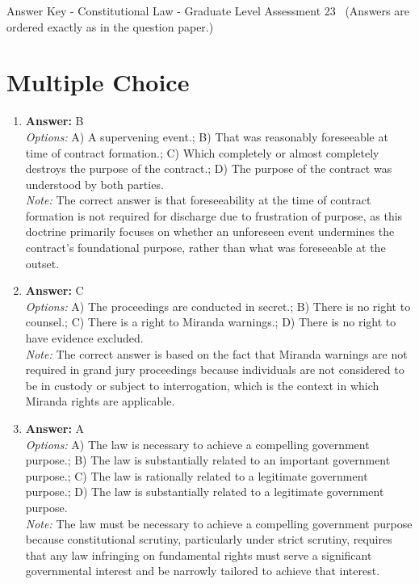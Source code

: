 \documentclass[12pt]{article}
\begin{document}
\begin{center}
Answer Key - Constitutional Law - Graduate Level Assessment 23 \
\small (Answers are ordered exactly as in the question paper.)
\end{center}

\section*{Multiple Choice}
\begin{enumerate}[label=\arabic*.]
\item \textbf{Answer:} B
\\ \textit{Options:} A) A supervening event.; B) That was reasonably foreseeable at time of contract formation.; C) Which completely or almost completely destroys the purpose of the contract.; D) The purpose of the contract was understood by both parties.
\\ \textit{Note:} The correct answer is that foreseeability at the time of contract formation is not required for discharge due to frustration of purpose, as this doctrine primarily focuses on whether an unforeseen event undermines the contract's foundational purpose, rather than what was foreseeable at the outset.
\item \textbf{Answer:} C
\\ \textit{Options:} A) The proceedings are conducted in secret.; B) There is no right to counsel.; C) There is a right to Miranda warnings.; D) There is no right to have evidence excluded.
\\ \textit{Note:} The correct answer is based on the fact that Miranda warnings are not required in grand jury proceedings because individuals are not considered to be in custody or subject to interrogation, which is the context in which Miranda rights are applicable.
\item \textbf{Answer:} A
\\ \textit{Options:} A) The law is necessary to achieve a compelling government purpose.; B) The law is substantially related to an important government purpose.; C) The law is rationally related to a legitimate government purpose.; D) The law is substantially related to a legitimate government purpose.
\\ \textit{Note:} The law must be necessary to achieve a compelling government purpose because constitutional scrutiny, particularly under strict scrutiny, requires that any law infringing on fundamental rights must serve a significant governmental interest and be narrowly tailored to achieve that interest.

\end{enumerate}
\end{document}

